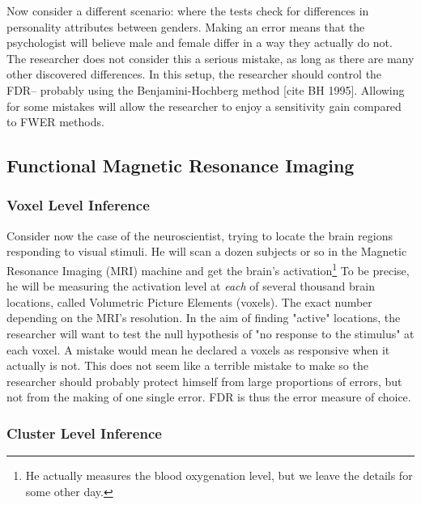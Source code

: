 \documentclass[draft,12pt]{article}
\begin{document}
Now consider a different scenario: where the tests check for differences in personality attributes between genders. Making an error means that the psychologist will believe male and female differ in a way they actually do not. The researcher does not consider this a serious mistake, as long as there are many other discovered differences. In this setup, the researcher should control the FDR-- probably using the Benjamini-Hochberg method [cite BH 1995]. Allowing for some mistakes will allow the researcher to enjoy a sensitivity gain compared to FWER methods.


\subsection{Functional Magnetic Resonance Imaging}
\subsubsection{Voxel Level Inference}
Consider now the case of the neuroscientist, trying to locate the brain regions responding to visual stimuli. He will scan a dozen subjects or so in the Magnetic Resonance Imaging (MRI) machine and get the brain's activation\footnote{ He actually measures the blood oxygenation level, but we leave the details for some other day.} To be precise, he will be measuring the activation level at \emph{each} of several thousand brain locations, called Volumetric Picture Elements (voxels). The exact number depending on the MRI's resolution. 
In the aim of finding "active" locations, the researcher will want to test the null hypothesis of "no response to the stimulus" at each voxel. A mistake would mean he declared a voxels as responsive when it actually is not. This does not seem like a terrible mistake to make so the researcher should probably protect himself from large proportions of errors, but not from the making of one single error. FDR is thus the error measure of choice.


\subsubsection{Cluster Level Inference}
\end{document}
